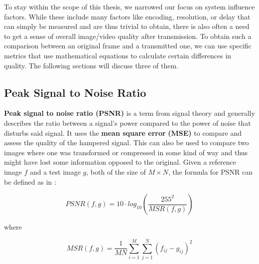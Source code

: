 To stay within the scope of this thesis, we narrowed our focus on system influence factors. While these include many factors like encoding, resolution, or delay that can simply be measured and are thus trivial to obtain, there is also often a need to get a sense of overall image/video quality after transmission. To obtain such a comparison between an original frame and a transmitted one, we can use specific metrics that use mathematical equations to calculate certain differences in quality. The following sections will discuss three of them. 


%



\subsection{Peak Signal to Noise Ratio}
\textbf{Peak signal to noise ratio (PSNR)} is a term from signal theory and generally describes the ratio between a signal's power compared to the power of noise that disturbs said signal. It uses the \textbf{mean square error} \textbf{(MSE)} to compare and assess the quality of the hampered signal. This can also be used to compare two images where one was transformed or compressed in some kind of way and thus might have lost some information opposed to the original. Given a reference image $ f $ and a test image $ g $, both of the size of $ M \times N $,  the formula for PSNR can be defined as in \cite{HoZi10}:

\begin{equation}
PSNR (f,g) = 10 \cdot log_{10}\left(\dfrac{255^{2}}{MSR(f,g)}\right)
\label{equation:quality_of_experience:PSNR_1}
\end{equation}

where

\begin{equation}
MSR(f,g) = \dfrac{1}{MN}\sum_{i=1}^{M}\sum_{j=1}^{N}(f_{ij}-g_{ij})^{2}
\label{equation:quality_of_experience:PSNR_2}
\end{equation}

